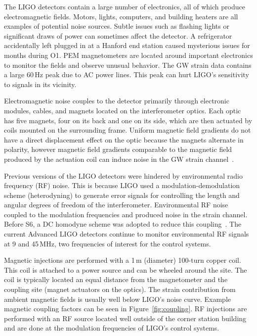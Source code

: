 The LIGO detectors contain a large number of electronics, all of which produce electromagnetic fields. Motors, lights, computers, and building heaters are all examples of potential noise sources. Subtle issues such as flashing lights or significant draws of power can sometimes affect the detector. A refrigerator accidentally left plugged in at a Hanford end station caused mysterious issues for months during O1. PEM magnetometers are located around important electronics to monitor the fields and observe unusual behavior. The GW strain data contains a large 60\,Hz peak due to AC power lines. This peak can hurt LIGO's sensitivity to signals in its vicinity.

Electromagnetic noise couples to the detector primarily through electronic modules, cables, and magnets located on the interferometer optics. Each optic has five magnets, four on its back and one on its side, which are then actuated by coils mounted on the surrounding frame. Uniform magnetic field gradients do not have a direct displacement effect on the optic because the magnets alternate in polarity, however magnetic field gradients comparable to the magnetic field produced by the actuation coil can induce noise in the GW strain channel~\cite{ana_pem}.

Previous versions of the LIGO detectors were hindered by environmental radio frequency (RF) noise. This is because LIGO used a modulation-demodulation scheme (heterodyning) to generate error signals for controlling the length and angular degrees of freedom of the interferometer. Environmental RF noise coupled to the modulation frequencies and produced noise in the strain channel. Before S6, a DC homodyne scheme was adopted to reduce this coupling~\cite{fricke2012dc}. The current Advanced LIGO detectors continue to monitor environmental RF signals at 9 and 45\,MHz, two frequencies of interest for the control systems.

Magnetic injections are performed with a 1\,m (diameter) 100-turn copper coil. This coil is attached to a power source and can be wheeled around the site. The coil is typically located an equal distance from the magnetometer and the coupling site (magnet actuators on the optics). The strain contribution from ambient magnetic fields is usually well below LIGO's noise curve. Example magnetic coupling factors can be seen in Figure~\ref{fig:coupling}. RF injections are performed with an RF source located well outside of the corner station building and are done at the modulation frequencies of LIGO's control systems.

